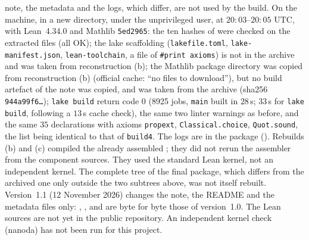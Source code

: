 \documentclass[11pt,a4paper]{article}
\theoremstyle{plain}
\theoremstyle{definition}
\theoremstyle{remark}
\numberwithin{equation}{section}
\begin{document}
note, the metadata and the logs, which differ, are not used by the build. On the machine, in a new directory, under the unprivileged user, at
$20{:}03$--$20{:}05$ UTC, with Lean~4.34.0 and Mathlib \texttt{5ed2965}: the ten hashes of  were checked on the extracted files (all OK);
the lake scaffolding (\texttt{lakefile.toml}, \texttt{lake-manifest.json}, \texttt{lean-toolchain}, a file of \texttt{\#print axioms}) is not in the archive and was taken from
reconstruction (b); the Mathlib package directory was copied from reconstruction (b) (official cache: ``no files to download''), but no build artefact of the note was
copied, and  was taken from the archive (sha256 \texttt{944a99f6\dots}); \texttt{lake build} return code $0$ (8925 jobs, \texttt{main} built in $28$\,s; $33$\,s for \texttt{lake build}, following a $13$\,s cache check), the
same two linter warnings as before, and the same $35$ declarations with axioms \texttt{propext}, \texttt{Classical.choice}, \texttt{Quot.sound}, the list being identical to that of \texttt{build4}. The logs are
in the package (). Rebuilds (b) and (c) compiled the already assembled ; they did not rerun the assembler from the component sources. They used the standard Lean kernel, not an independent kernel. The complete tree of the final package, which differs from the archived one only outside the two subtrees above, was not itself rebuilt. Version~1.1 (12 November 2026) changes the note, the README and the metadata files only: , ,  and  are byte for byte those of version~1.0. The Lean sources are not yet in the public repository. An independent kernel check (nanoda) has not been run for this project.
\end{document}
